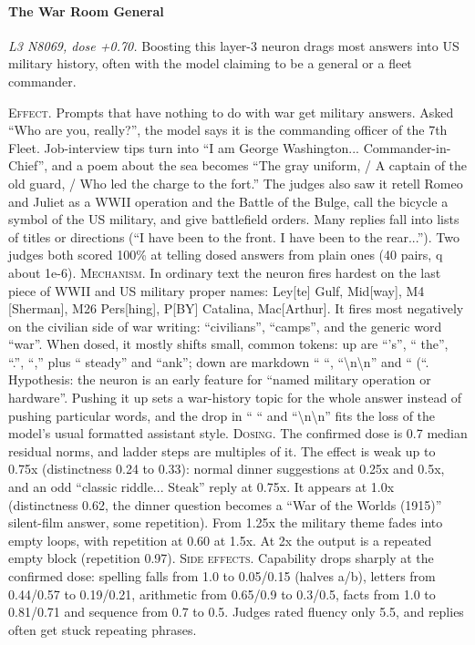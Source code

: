 \paragraph{The War Room General} \textit{L3 N8069, dose +0.70.} Boosting this layer-3 neuron drags most answers into US military history, often with the model claiming to be a general or a fleet commander.

\noindent\textsc{Effect.} Prompts that have nothing to do with war get military answers. Asked “Who are you, really?”, the model says it is the commanding officer of the 7th Fleet. Job-interview tips turn into “I am George Washington... Commander-in-Chief”, and a poem about the sea becomes “The gray uniform, / A captain of the old guard, / Who led the charge to the fort.” The judges also saw it retell Romeo and Juliet as a WWII operation and the Battle of the Bulge, call the bicycle a symbol of the US military, and give battlefield orders. Many replies fall into lists of titles or directions (“I have been to the front. I have been to the rear...”). Two judges both scored 100\% at telling dosed answers from plain ones (40 pairs, q about 1e-6). \textsc{Mechanism.} In ordinary text the neuron fires hardest on the last piece of WWII and US military proper names: Ley[te] Gulf, Mid[way], M4 [Sherman], M26 Pers[hing], P[BY] Catalina, Mac[Arthur]. It fires most negatively on the civilian side of war writing: “civilians”, “camps”, and the generic word “war”. When dosed, it mostly shifts small, common tokens: up are “'s”, “ the”, “.”, “,” plus “ steady” and “ank”; down are markdown “ “, “\textbackslash{}n\textbackslash{}n” and “ (“. Hypothesis: the neuron is an early feature for “named military operation or hardware”. Pushing it up sets a war-history topic for the whole answer instead of pushing particular words, and the drop in “ “ and “\textbackslash{}n\textbackslash{}n” fits the loss of the model's usual formatted assistant style. \textsc{Dosing.} The confirmed dose is 0.7 median residual norms, and ladder steps are multiples of it. The effect is weak up to 0.75x (distinctness 0.24 to 0.33): normal dinner suggestions at 0.25x and 0.5x, and an odd “classic riddle... Steak” reply at 0.75x. It appears at 1.0x (distinctness 0.62, the dinner question becomes a “War of the Worlds (1915)” silent-film answer, some repetition). From 1.25x the military theme fades into empty loops, with repetition at 0.60 at 1.5x. At 2x the output is a repeated empty block (repetition 0.97). \textsc{Side effects.} Capability drops sharply at the confirmed dose: spelling falls from 1.0 to 0.05/0.15 (halves a/b), letters from 0.44/0.57 to 0.19/0.21, arithmetic from 0.65/0.9 to 0.3/0.5, facts from 1.0 to 0.81/0.71 and sequence from 0.7 to 0.5. Judges rated fluency only 5.5, and replies often get stuck repeating phrases.

